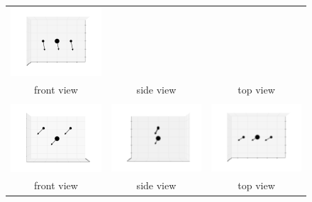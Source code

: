 \documentclass[11pt]{article}
\begin{document}
\begin{figure}[htp]
\begin{tabular}{|ccc|}
	\includegraphics[width=5.5cm,clip=true,trim=3cm 2cm 3cm 2cm]{90-0_1.pdf}\\front view&side view&top view\\\hline&&\\
	\includegraphics[width=5.5cm,clip=true,trim=3cm 2cm 3cm 2cm]{0-0_2.pdf}&
	\includegraphics[width=5.5cm,clip=true,trim=3cm 2cm 3cm 2cm]{0-90_2.pdf}&
	\includegraphics[width=5.5cm,clip=true,trim=3cm 2cm 3cm 2cm]{90-0_2.pdf}\\front view&side view&top view\\\hline
	\end{tabular}
\end{figure}
\newpage
\end{document}

